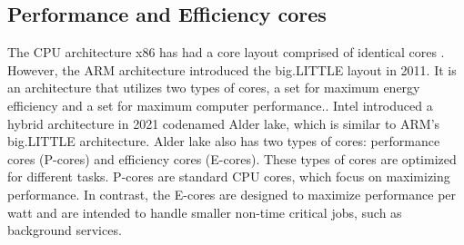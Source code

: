 \subsection{Performance and Efficiency cores}
The CPU architecture x86 has had a core layout comprised of identical cores%
. However, the ARM architecture introduced the big.LITTLE layout in 2011\cite{ARM2011origin}. It is an architecture that utilizes two types of cores, a set for maximum energy efficiency and a set for maximum computer performance.\cite{ARMWhatIsIt}. Intel introduced a hybrid architecture in 2021\cite{Intel2021Alder} codenamed Alder lake, which is similar to ARM's big.LITTLE architecture. Alder lake also has two types of cores: performance cores (P-cores) and efficiency cores (E-cores). These types of cores are optimized for different tasks. P-cores are standard CPU cores, which focus on maximizing performance. In contrast, the E-cores are designed to maximize performance per watt and are intended to handle smaller non-time critical jobs, such as background services\cite{rotem2022intel}.
